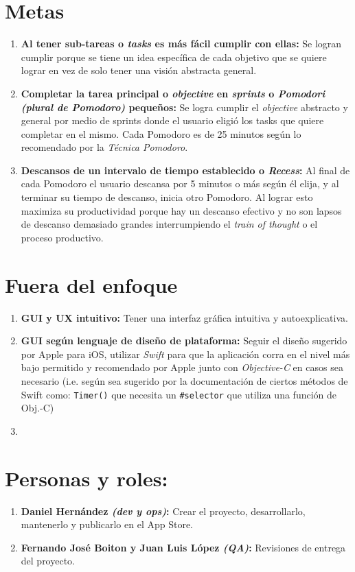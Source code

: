 \documentclass[]{article}
\begin{document}
\section{Metas}
\begin{enumerate}
	\item \textbf{Al tener sub-tareas o \textit{tasks} es más fácil cumplir con ellas:} Se logran cumplir porque se tiene un idea específica de cada objetivo que se quiere lograr en vez de solo tener una visión abstracta general.
	
	\item \textbf{Completar la tarea principal o \textit{objective} en \textit{sprints} o \textit{Pomodori (plural de Pomodoro)} pequeños:} Se logra cumplir el \textit{objective} abstracto y general por medio de sprints donde el usuario eligió los tasks que quiere completar en el mismo. Cada Pomodoro es de 25 minutos según lo recomendado por la \textit{Técnica Pomodoro}.
	
	\item \textbf{Descansos de un intervalo de tiempo establecido o \textit{Recess}:} Al final de cada Pomodoro el usuario descansa por 5 minutos o más según él elija, y al terminar su tiempo de descanso, inicia otro Pomodoro. Al lograr esto maximiza su productividad porque hay un descanso efectivo y no son lapsos de descanso demasiado grandes interrumpiendo el \textit{train of thought} o el proceso productivo.
\end{enumerate}

\section{Fuera del enfoque}
\begin{enumerate}
	\item \textbf{GUI y UX intuitivo:} Tener una interfaz gráfica intuitiva y autoexplicativa.
	\item \textbf{GUI según lenguaje de diseño de plataforma:} Seguir el diseño sugerido por Apple para iOS, utilizar \textit{Swift} para que la aplicación corra en el nivel más bajo permitido y recomendado por Apple junto con \textit{Objective-C} en casos sea necesario (i.e. según sea sugerido por la documentación de ciertos métodos de Swift como: \texttt{Timer()} que necesita un \texttt{\#selector} que utiliza una función de Obj.-C)
	\item 
\end{enumerate}

\section{Personas y roles:}
\begin{enumerate}
	\item \textbf{Daniel Hernández \textit{(dev y ops)}:} Crear el proyecto, desarrollarlo, mantenerlo y publicarlo en el App Store. 
	\item \textbf{Fernando José Boiton y Juan Luis López \textit{(QA)}:} Revisiones de entrega del proyecto.  
\end{enumerate}
\end{document}
